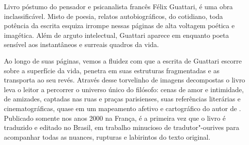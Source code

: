 \medskip

\noindent{}Livro póstumo do pensador e psicanalista francês Félix Guattari, {} é uma obra inclassificável. Misto de poesia, relatos autobiográficos, {} do cotidiano, toda potência da escrita esquiza irrompe nessas páginas de alta voltagem poética e imagética. Além de arguto intelectual, Guattari aparece em {} enquanto poeta sensível aos instantâneos e surreais quadros da vida.

Ao longo de suas páginas, vemos a fluidez com que a escrita de Guattari escorre sobre a superfície da vida, penetra em suas estruturas fragmentadas e as transporta ao seu revés. Através desse torvelinho de imagens decompostas o livro leva o leitor a percorrer o universo único do filósofo: cenas de amor e intimidade, de amizades, captadas nas ruas e praças parisienses, suas referências literárias e cinematográficas, quase em um mapeamento afetivo e cartográfico do autor de {}. Publicado somente nos anos 2000 na França, é a primeira vez que o livro é traduzido e editado no Brasil, em trabalho minucioso de tradutor"-ourives para acompanhar todas as nuances, rupturas e labirintos do texto original.

\vfill

\hspace*{-.4cm}\begin{minipage}[c]{.5\linewidth}
\small{
{}}
\end{minipage}

\pagebreak

\hspace{.5cm}

